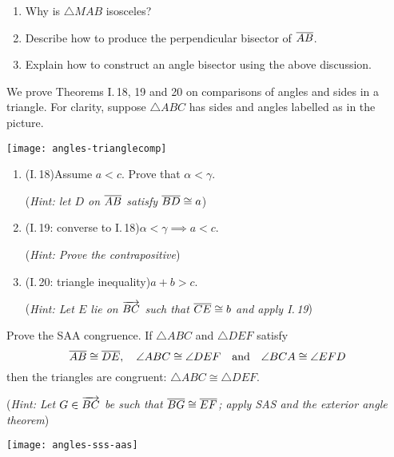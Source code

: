 \begin{exercises}
\begin{enumerate}
\begin{enumerate}
		  \item Why is $\triangle MAB$ isosceles?
		  
		  \item Describe how to produce the perpendicular bisector of $\overline{AB}$.
		  
		  \item Explain how to construct an angle bisector using the above discussion.
		\end{enumerate}
	  
	 
	  
	  \begin{minipage}[t]{0.57\linewidth}\vspace{0pt}
		  \item\label{ex:euclidi19} We prove Theorems I.\,18, 19 and 20 on comparisons of angles and sides in a triangle. For clarity, suppose $\triangle ABC$ has sides and angles labelled as in the picture.
		\end{minipage}
		\hfill
		\begin{minipage}[t]{0.42\linewidth}\vspace{0pt}
		  \flushright
		  \texttt{[image: angles-trianglecomp]}
	  \end{minipage}
	  \vspace{-55pt}
	  \begin{enumerate}
	    \item (I.\,18)\quad Assume $a<c$. Prove that $\alpha<\gamma$.\par
	    (\emph{Hint: let $D$ on $\overline{AB}$ satisfy $\overline{BD}\cong a$})
	    \item (I.\,19: converse to I.\,18)\quad $\alpha<\gamma\implies a<c$.\par
	    (\emph{Hint: Prove the contrapositive})
	    \item (I.\,20: triangle inequality)\quad $a+b>c$.\par
	    (\emph{Hint: Let $E$ lie on $\overrightarrow{BC}$ such that $\overline{CE}\cong b$ and apply I.\,19})
	  \end{enumerate}
	   
	  
	  \begin{minipage}[t]{0.68\linewidth}\vspace{0pt}
		  \item\label{exs:saaproof} Prove the SAA congruence. If $\triangle ABC$ and $\triangle DEF$ satisfy
		  \[
		  	\overline{AB}\cong\overline{DE},\quad \angle ABC\cong\angle{DEF}\quad \text{and}\quad\angle BCA\cong\angle EFD
		  \]
		  then the triangles are congruent: $\triangle ABC\cong\triangle DEF$.\par
		  (\emph{Hint: Let $G\in\overrightarrow{BC}$ be such that $\overline{BG}\cong\overline{EF}$; apply SAS and the exterior angle theorem})
	  \end{minipage}
	  \hfill
	  \begin{minipage}[t]{0.3\linewidth}\vspace{0pt}
			\flushright
			\texttt{[image: angles-sss-aas]}
		\end{minipage}
	  

\end{enumerate}
\end{exercises}
